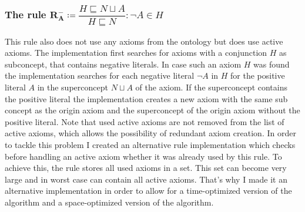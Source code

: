 \documentclass[titlepage]{article}
\begin{document}
\subsubsection{The rule $\mathbf{R^{-}_A} \coloneq \dfrac{H \sqsubseteq N \sqcup A}{H \sqsubseteq N} : \neg A \in H  \label{rules:RMinusA}$}
This rule also does not use any axioms from the ontology but does use active axioms.
The implementation first searches for axioms with a conjunction $H$ as subconcept, that contains negative
literals. In case such an axiom $H$ was found the implementation searches for each negative literal $\neg A$ in $H$ for
 the positive literal $A$ in the superconcept
$N \sqcup A$ of the axiom. 
If the superconcept contains the positive literal the implementation creates a new axiom with 
the same sub concept as the origin axiom and the superconcept of the origin axiom without the positive literal.
Note that used active axioms are not removed from the list of active axioms, which allows the possibility of
redundant axiom creation. In order to tackle this problem I created an alternative rule implementation
which checks before handling an active axiom
whether it was already used by this rule. To achieve this, the rule stores all used axioms in a set. This set can 
become very large and in worst case can contain all active axioms. That's why I made it an alternative implementation
in order to allow for a time-optimized version of the algorithm and a space-optimized version of the algorithm.
\end{document}
